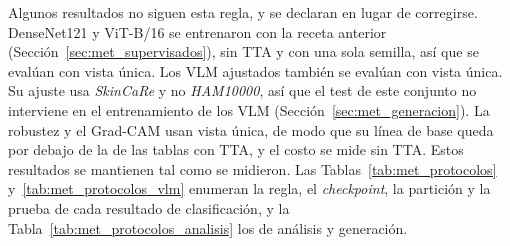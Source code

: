 Algunos resultados no siguen esta regla, y se declaran en lugar de corregirse. DenseNet121 y ViT-B/16 se entrenaron con
la receta anterior (Sección~\ref{sec:met_supervisados}), sin TTA y con una sola semilla, así que se evalúan con vista
única. Los VLM ajustados también se
evalúan con vista única. Su ajuste usa \emph{SkinCaRe} y no \emph{HAM10000}, así que el test de este conjunto no
interviene en el entrenamiento de los VLM (Sección~\ref{sec:met_generacion}). La robustez y el Grad-CAM usan vista única,
de modo que su línea de base queda por debajo de la de las tablas con TTA, y el costo se mide sin TTA. Estos resultados se
mantienen tal como se midieron. Las Tablas~\ref{tab:met_protocolos} y~\ref{tab:met_protocolos_vlm} enumeran la regla, el \emph{checkpoint}, la partición
y la prueba de cada resultado de clasificación, y la Tabla~\ref{tab:met_protocolos_analisis} los de análisis y generación.

